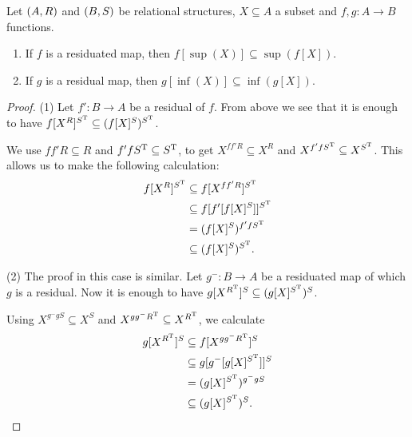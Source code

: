 \begin{proposition} \label{residuationPreservesSupInf}
Let $\sSet{A, R}$ and $\sSet{B, S}$ be relational structures, $X\subseteq A$ a subset and $f,g : A\to B$ functions.
\begin{enumerate}
\item If $f$ is a residuated map, then $f[\sup(X)] \subseteq \sup(f[X])$.
\item If $g$ is a residual map, then $g[\inf(X)] \subseteq \inf(g[X])$.
\end{enumerate}
\end{proposition}
\begin{proof}
(1) Let $f': B\to A$ be a residual of $f$. From above we see that it is enough to have $f[X^R]^{S^{\mathrm{T}}} \subseteq (f[X]^S)^{S^{\mathrm{T}}}$.

We use $ff'R \subseteq R$ and $f'fS^{\mathrm{T}} \subseteq S^{\mathrm{T}}$, to get $X^{ff'R} \subseteq X^{R}$ and $X^{f'fS^{\mathrm{T}}} \subseteq X^{S^{\mathrm{T}}}$. This allows us to make the following calculation:
\begin{align*}
f[X^R]^{S^{\mathrm{T}}} &\subseteq f[X^{ff'R}]^{S^{\mathrm{T}}} \\
&\subseteq f[f'[f[X]^S]]^{S^{\mathrm{T}}} \\
&= (f[X]^S)^{f'fS^{\mathrm{T}}} \\
&\subseteq (f[X]^S)^{S^{\mathrm{T}}}.
\end{align*}

(2) The proof in this case is similar. Let $g^-: B\to A$ be a residuated map of which $g$ is a residual. Now it is enough to have $g[X^{R^{\mathrm{T}}}]^{S} \subseteq (g[X]^{S^{\mathrm{T}}})^{S}$.

Using $X^{g^-gS}\subseteq X^S$ and $X^{gg^-R^{\mathrm{T}}} \subseteq X^{R^{\mathrm{T}}}$, we calculate
\begin{align*}
g[X^{R^{\mathrm{T}}}]^{S} &\subseteq f[X^{gg^-R^{\mathrm{T}}}]^{S} \\
&\subseteq g[g^-[g[X]^{S^{\mathrm{T}}}]]^{S} \\
&= (g[X]^{S^{\mathrm{T}}})^{g^-gS} \\
&\subseteq (g[X]^{S^{\mathrm{T}}})^{S}.
\end{align*}
\end{proof}

